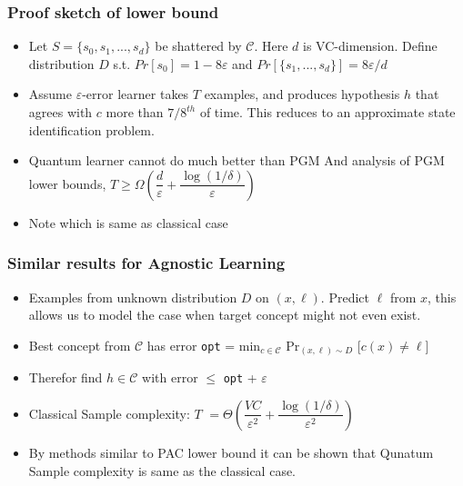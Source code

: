 \documentclass{beamer}
\begin{document}
\begin{frame}\frametitle{Proof sketch of lower bound}
\begin{itemize}
    \item Let $S = \{ s_{0}, s_{1},..., s_{d} \}$ be shattered by 
$\mathcal{C}$. Here $d$ is VC-dimension. Define distribution $D$
    s.t. $Pr[s_{0}] = 1- 8 \varepsilon$ and $Pr[\{s_{1},..., s_{d}\}] = 8\varepsilon/d$

    \item Assume $\varepsilon$-error learner takes $T$ examples,
    and produces hypothesis $h$ that agrees with $c$ more than $7/8^{th}$
    of time. This reduces to an approximate state identification problem.

    \item Quantum learner cannot do much better than PGM 
    And analysis of PGM lower bounds,  $T \geq \Omega(\dfrac{d}{\varepsilon} + \dfrac{\log(1/\delta)}{\varepsilon})$

    \item Note which is same as classical case

\end{itemize}
\end{frame}



\begin{frame}
\frametitle{Similar results for Agnostic Learning}
    \begin{itemize}
       \item Examples from unknown distribution $D$ on $(x, \ell)$. Predict
       $\ell$ from $x$, this allows us to model the case when 
       target concept might not even exist.

       \item Best concept from $\mathcal{C}$ has error \texttt{opt} = min$_{c \in \mathcal{C}}$ Pr$_{(x, \ell) \sim D}$ [$c(x) \neq \ell$]
       \item Therefor find $h \in \mathcal{C}$ with error $\leq$ \texttt{opt} + $\varepsilon$
       \item Classical Sample complexity: $T$ $= \Theta(\dfrac{VC}{\varepsilon^{2}} + \dfrac{\log(1/\delta)}{\varepsilon^{2}} )$
       \item By methods similar to PAC lower bound it can be shown that Qunatum Sample complexity is same as the classical case.
    \end{itemize}
\end{frame}
\end{document}
